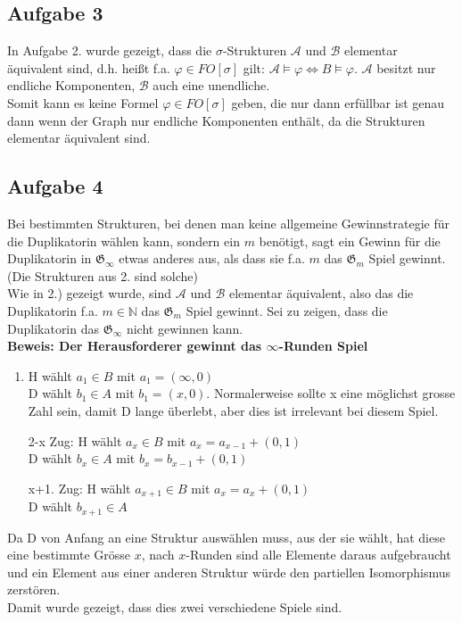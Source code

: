 \documentclass[a4paper,10pt]{article}
\newcommand{\N}{\mathbb{N}}
\begin{document}
\subsection*{Aufgabe 3}
In Aufgabe 2. wurde gezeigt, dass die $\sigma$-Strukturen $\mathcal{A}$ und $\mathcal{B}$ elementar äquivalent sind, d.h. heißt f.a. $\varphi \in FO[\sigma]$ gilt: $\mathcal{A} \vDash \varphi \Leftrightarrow B \vDash \varphi$. $\mathcal{A}$ besitzt nur endliche Komponenten, $\mathcal{B}$ auch eine unendliche. \\Somit kann es keine Formel $\varphi \in FO[\sigma]$ geben, die nur dann erfüllbar ist genau dann wenn der Graph nur endliche Komponenten enthält, da die Strukturen elementar äquivalent sind.


\subsection*{Aufgabe 4}

Bei bestimmten Strukturen, bei denen man keine allgemeine Gewinnstrategie für die Duplikatorin wählen kann, sondern ein $m$ benötigt, sagt ein Gewinn für die Duplikatorin in $\mathfrak{G}_{\infty}$ etwas anderes aus, als dass sie f.a. $m $ das $\mathfrak{G}_m$ Spiel gewinnt. (Die Strukturen aus 2. sind solche) \\

Wie in 2.) gezeigt wurde, sind $\mathcal{A}$ und $\mathcal{B}$ elementar äquivalent, also das die Duplikatorin f.a. $m \in \N$ das $\mathfrak{G}_m$ Spiel gewinnt.
Sei zu zeigen, dass die Duplikatorin das $\mathfrak{G}_{\infty}$ nicht gewinnen kann. \\

\textbf{Beweis: Der Herausforderer gewinnt das $\infty$-Runden Spiel}
		\begin{enumerate}[1. \text{Zug:}]
			\item  	H wählt $a_1 \in B$ mit $a_1 = (\infty, 0)$ \\
				D wählt $b_1 \in A$ mit $b_1 = (x,0)$. Normalerweise sollte x eine möglichst grosse Zahl sein, damit D lange überlebt, aber dies ist irrelevant bei diesem Spiel.
			\item[2-x Zug:] 	H wählt $a_x \in B$ mit $a_x = a_{x-1} + (0,1)$ \\
				D wählt $b_x \in A$ mit $b_x = b_{x-1} + (0,1)$

			\item[x+1. Zug:] 	H wählt $a_{x+1} \in B$ mit $a_x = a_{x} + (0,1)$ \\
						D wählt $b_{x+1} \in A$	
		\end{enumerate}
		Da D von Anfang an eine Struktur auswählen muss, aus der sie wählt, hat diese eine bestimmte Grösse $x$, nach $x$-Runden sind alle Elemente daraus aufgebraucht und ein Element aus einer anderen Struktur würde den partiellen Isomorphismus zerstören. \\

		Damit wurde gezeigt, dass dies zwei verschiedene Spiele sind.
\end{document}
